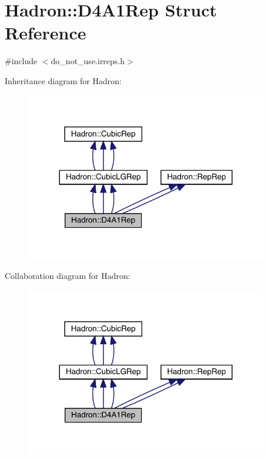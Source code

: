\hypertarget{structHadron_1_1D4A1Rep}{}\section{Hadron\+:\+:D4\+A1\+Rep Struct Reference}
\label{structHadron_1_1D4A1Rep}


{\ttfamily \#include $<$do\+\_\+not\+\_\+use.\+irreps.\+h$>$}



Inheritance diagram for Hadron\+:
\nopagebreak
\begin{figure}[H]
\begin{center}
\leavevmode
\includegraphics[width=300pt]{d6/d46/structHadron_1_1D4A1Rep__inherit__graph}
\end{center}
\end{figure}


Collaboration diagram for Hadron\+:
\nopagebreak
\begin{figure}[H]
\begin{center}
\leavevmode
\includegraphics[width=300pt]{db/dee/structHadron_1_1D4A1Rep__coll__graph}
\end{center}
\end{figure}
